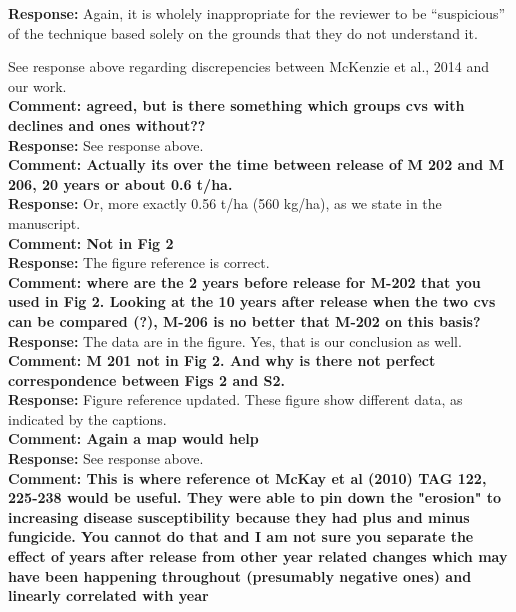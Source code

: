 \documentclass{article} \usepackage[margin=1in]{geometry}
\begin{document}
\textbf{Response: } Again, it is wholely inappropriate for the
reviewer to be ``suspicious'' of the technique based solely on the
grounds that they do not understand it.

See response above regarding discrepencies between McKenzie et al.,
2014 and our work.\\

\textbf{Comment: agreed, but is there something which groups cvs with
  declines and ones without??}\\

\textbf{Response: } See response above.\\

\textbf{Comment: Actually its over the time between release of M 202
  and M 206, 20 years or about 0.6 t/ha.}\\

\textbf{Response: } Or, more exactly 0.56 t/ha (560 kg/ha), as we
state in the manuscript.\\

\textbf{Comment: Not in Fig 2 }\\

\textbf{Response: } The figure reference is correct.\\

\textbf{Comment: where are the 2 years before release for M-202 that
  you used in Fig 2. Looking at the 10 years after release when the
  two cvs can be compared (?), M-206 is no better that M-202 on this
  basis?}\\

\textbf{Response: } The data are in the figure. Yes, that is our
conclusion as well.\\

\textbf{Comment: M 201 not in Fig 2. And why is there not perfect
  correspondence between Figs 2 and S2.}\\

\textbf{Response: } Figure reference updated. These figure show
different data, as indicated by the captions.\\

\textbf{Comment: Again a map would help}\\

\textbf{Response: } See response above.\\

\textbf{Comment: This is where reference ot McKay et al (2010) TAG
  122, 225-238 would be useful. They were able to pin down the
  "erosion" to increasing disease susceptibility because they had plus
  and minus fungicide. You cannot do that and I am not sure you
  separate the effect of years after release from other year related
  changes which may have been happening throughout (presumably
  negative ones) and linearly correlated with year} \\
\end{document}
